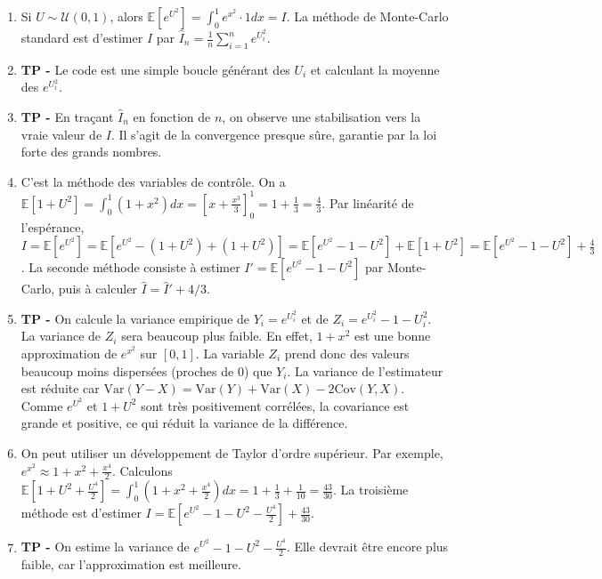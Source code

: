 \documentclass[solutions]{exercices}
\begin{document}
\begin{solution}
\begin{enumerate}
    \item Si $U\sim\mathcal{U}(0,1)$, alors $\mathbb{E}[e^{U^2}] = \int_0^1 e^{x^2} \cdot 1 dx = I$. La méthode de Monte-Carlo standard est d'estimer $I$ par $\hat{I}_n = \frac{1}{n} \sum_{i=1}^n e^{U_i^2}$.
    \item \textbf{TP -} Le code est une simple boucle générant des $U_i$ et calculant la moyenne des $e^{U_i^2}$.
    \item \textbf{TP -} En traçant $\hat{I}_n$ en fonction de $n$, on observe une stabilisation vers la vraie valeur de $I$. Il s'agit de la convergence presque sûre, garantie par la loi forte des grands nombres.
    \item C'est la méthode des variables de contrôle. On a $\mathbb{E}[1+U^2] = \int_0^1 (1+x^2)dx = [x + \frac{x^3}{3}]_0^1 = 1 + \frac{1}{3} = \frac{4}{3}$.
    Par linéarité de l'espérance, $I = \mathbb{E}[e^{U^2}] = \mathbb{E}[e^{U^2} - (1+U^2) + (1+U^2)] = \mathbb{E}[e^{U^2}-1-U^2] + \mathbb{E}[1+U^2] = \mathbb{E}[e^{U^2}-1-U^2] + \frac{4}{3}$.
    La seconde méthode consiste à estimer $I' = \mathbb{E}[e^{U^2}-1-U^2]$ par Monte-Carlo, puis à calculer $\hat{I} = \hat{I}' + 4/3$.
    \item \textbf{TP -} On calcule la variance empirique de $Y_i = e^{U_i^2}$ et de $Z_i = e^{U_i^2}-1-U_i^2$. La variance de $Z_i$ sera beaucoup plus faible. En effet, $1+x^2$ est une bonne approximation de $e^{x^2}$ sur $[0,1]$. La variable $Z_i$ prend donc des valeurs beaucoup moins dispersées (proches de 0) que $Y_i$. La variance de l'estimateur est réduite car $\mathrm{Var}(Y-X) = \mathrm{Var}(Y)+\mathrm{Var}(X) - 2\mathrm{Cov}(Y,X)$. Comme $e^{U^2}$ et $1+U^2$ sont très positivement corrélées, la covariance est grande et positive, ce qui réduit la variance de la différence.
    \item On peut utiliser un développement de Taylor d'ordre supérieur. Par exemple, $e^{x^2} \approx 1+x^2 + \frac{x^4}{2}$.
    Calculons $\mathbb{E}[1+U^2+\frac{U^4}{2}] = \int_0^1 (1+x^2+\frac{x^4}{2}) dx = 1+\frac{1}{3}+\frac{1}{10} = \frac{43}{30}$.
    La troisième méthode est d'estimer $I = \mathbb{E}[e^{U^2}-1-U^2-\frac{U^4}{2}]+\frac{43}{30}$.
    \item \textbf{TP -} On estime la variance de $e^{U^2}-1-U^2-\frac{U^4}{2}$. Elle devrait être encore plus faible, car l'approximation est meilleure.
\end{enumerate}
\end{solution}
\end{document}
